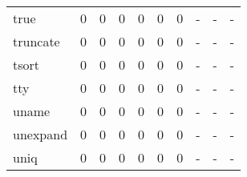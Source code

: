 \begin{longtable}{lp{2.0cm}p{2.0cm}p{2.0cm}p{2.0cm}p{2.0cm}p{2.0cm}p{2.0cm}p{2.0cm}p{2.0cm}}
true      &                      0 &                                             0 &                                            0 &                                           0 &                                            0 &                                          0 &                                    - &                                      - &                                    - \\
truncate  &                      0 &                                             0 &                                            0 &                                           0 &                                            0 &                                          0 &                                    - &                                      - &                                    - \\
tsort     &                      0 &                                             0 &                                            0 &                                           0 &                                            0 &                                          0 &                                    - &                                      - &                                    - \\
tty       &                      0 &                                             0 &                                            0 &                                           0 &                                            0 &                                          0 &                                    - &                                      - &                                    - \\
uname     &                      0 &                                             0 &                                            0 &                                           0 &                                            0 &                                          0 &                                    - &                                      - &                                    - \\
unexpand  &                      0 &                                             0 &                                            0 &                                           0 &                                            0 &                                          0 &                                    - &                                      - &                                    - \\
uniq      &                      0 &                                             0 &                                            0 &                                           0 &                                            0 &                                          0 &                                    - &                                      - &                                    - \\

\end{longtable}

